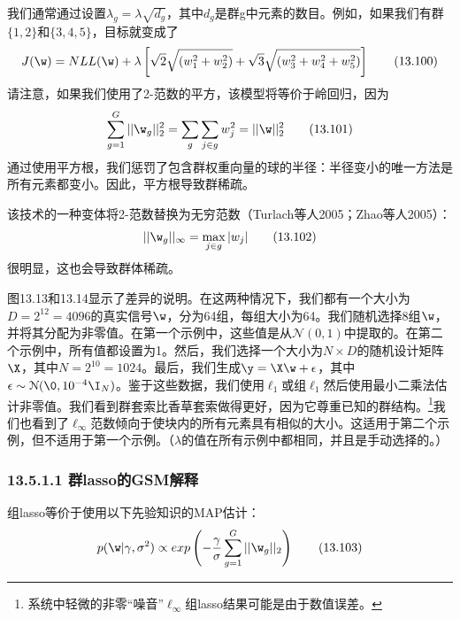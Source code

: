 \documentclass[a4paper]{article}
\begin{document}
我们通常通过设置$\lambda_g=\lambda\sqrt{d_g}$，其中$d_g$是群g中元素的数目。例如，如果我们有群$\{1,2\}$和$\{3,4,5\}$，目标就变成了
\begin{equation}
	J(\w)=NLL(\w)+\lambda\left[\sqrt{2}\sqrt{(w_1^2+w_2^2)}+\sqrt{3}\sqrt{(w_3^2+w_4^2+w_5^2)}\right]\tag{13.100}
\end{equation}
请注意，如果我们使用了2-范数的平方，该模型将等价于岭回归，因为
\begin{equation}
	\sum_{g=1}^{G}||\w_g||_2^2=\sum_{g}\sum_{j\in g}w_j^2=||\w||_2^2\tag{13.101}
\end{equation}
通过使用平方根，我们惩罚了包含群权重向量的球的半径：半径变小的唯一方法是所有元素都变小。因此，平方根导致群稀疏。

该技术的一种变体将2-范数替换为无穷范数（Turlach等人2005；Zhao等人2005）：
\begin{equation}
	||\w_g||_\infty =\max_{j\in g}|w_j|\tag{13.102}
\end{equation}
很明显，这也会导致群体稀疏。

图13.13和13.14显示了差异的说明。在这两种情况下，我们都有一个大小为$D=2^{12}=4096$的真实信号$\w$，分为64组，每组大小为64。我们随机选择8组$\w$，并将其分配为非零值。在第一个示例中，这些值是从$\mathcal{N}(0,1)$中提取的。在第二个示例中，所有值都设置为1。然后，我们选择一个大小为$N\times D$的随机设计矩阵$\X$，其中$N=2^{10}=1024$。最后，我们生成$\y=\X\w+\epsilon$，其中$\epsilon \sim\mathcal{N}(\0,10^{-4}\I_N)$。鉴于这些数据，我们使用$\ell_1$或组$\ell_1$然后使用最小二乘法估计非零值。我们看到群套索比香草套索做得更好，因为它尊重已知的群结构。\footnote{系统中轻微的非零“噪音”$\ell_\infty$组lasso结果可能是由于数值误差。}我们也看到了$\ell_\infty$范数倾向于使块内的所有元素具有相似的大小。这适用于第二个示例，但不适用于第一个示例。（$\lambda$的值在所有示例中都相同，并且是手动选择的。）

\subsubsection*{13.5.1.1 群lasso的GSM解释}
组lasso等价于使用以下先验知识的MAP估计：
\begin{equation}
p(\w|\gamma,\sigma^2) \propto exp\left(-\frac{\gamma}{\sigma}\sum_{g=1}^{G}||\w_g||_2\right)\tag{13.103}
\end{equation}
\end{document}
